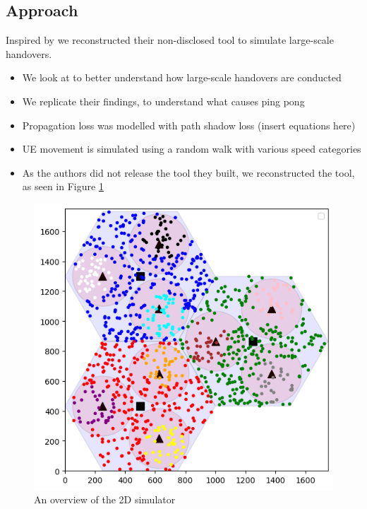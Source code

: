 \subsection{Approach}
Inspired by \citep{hatipoglu_handover-based_2020} we reconstructed their non-disclosed tool to simulate large-scale handovers.
\begin{itemize}
    \item We look at  to better understand how large-scale handovers are conducted
    \item We replicate their findings, to understand what causes ping pong
    \item Propagation loss was modelled with path shadow loss (insert equations here)
    \item UE movement is simulated using a random walk with various speed categories
    \item As the authors did not release the tool they built, we reconstructed the tool, as seen in Figure \ref{fig:methods:grouped-uesim}
\end{itemize}
\begin{figure}
    \centering
    \includegraphics[width=0.75\linewidth]{src//img/grouped_uesim.png}
    \caption{An overview of the 2D simulator}
    \label{fig:methods:grouped-uesim}
\end{figure}
